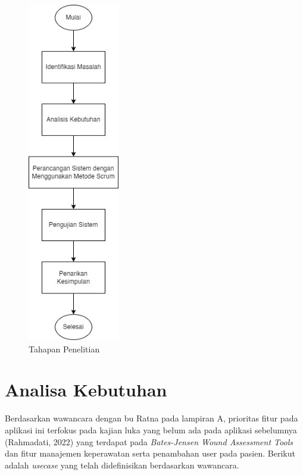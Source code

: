\begin{figure}[H]
	\centering
	\includegraphics[keepaspectratio, width=4cm]{gambar/tahapan_penelitian}
	\caption{Tahapan Penelitian}
	\label{gambar:tahapan_penelitian}
\end{figure}

\section{Analisa Kebutuhan}

Berdasarkan wawancara dengan bu Ratna pada lampiran A, prioritas fitur pada aplikasi ini terfokus pada kajian luka yang belum ada pada aplikasi sebelumnya (Rahmadati, 2022) yang terdapat pada \textit{Bates-Jensen Wound Assessment Tools} dan fitur manajemen keperawatan serta penambahan user pada pasien. Berikut adalah \textit{usecase} yang telah didefinisikan berdasarkan wawancara.

